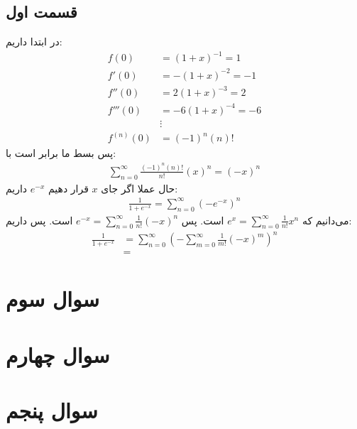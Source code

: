 \documentclass[]{article}
\begin{document}
\subsection*{قسمت اول}
در ابتدا داریم:
\begin{align*}
    f(0) &= (1 + x)^{-1} = 1\\
    f'(0) &= -(1 + x)^{-2} = -1\\
    f''(0) &= 2(1 + x)^{-3} = 2\\
    f'''(0) &= -6(1 + x)^{-4} = -6\\
    &\vdots\\
    f^{(n)}(0) &= (-1)^{n} (n)!
\end{align*}
پس بسط ما برابر است با:
\begin{gather*}
    \sum_{n=0}^{\infty} \frac{(-1)^{n} (n)!}{n!}(x)^n = (-x)^n
\end{gather*}
حال عملا اگر جای
$x$ قرار دهیم $e^{-x}$
داریم:
\begin{gather*}
    \frac{1}{1+e^{-x}} = \sum_{n=0}^{\infty} (-e^{-x})^n
\end{gather*}
می‌دانیم که
$e^x = \sum_{n=0}^{\infty} \frac{1}{n!}x^n$
است. پس
$e^{-x} = \sum_{n=0}^{\infty} \frac{1}{n!}(-x)^n$
است. پس داریم:
\begin{align*}
    \frac{1}{1+e^{-x}} &= \sum_{n=0}^{\infty} (- \sum_{m=0}^{\infty} \frac{1}{m!}(-x)^m)^n\\
    &= 
\end{align*}
\section*{سوال سوم}
\section*{سوال چهارم}
\section*{سوال پنجم}
\end{document}
